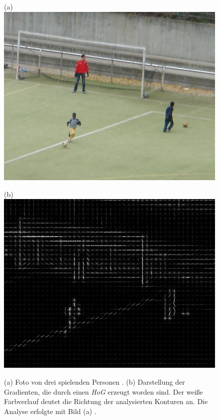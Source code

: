 
\begin{figure}[H]
	\centering
	\begin{minipage}[b]{0.47\textwidth}
		(a)
		\includegraphics[width=\textwidth]{Bilder/hog1crop.png}
	\end{minipage}
	\hfill
	\begin{minipage}[b]{0.47\textwidth}
		(b)
		\includegraphics[width=\textwidth]{Bilder/hog2crop.jpg}
	\end{minipage}
	\caption{(a) Foto von drei spielenden Personen \cite{inria1}. (b) Darstellung der Gradienten, die durch einen \textit{HoG} erzeugt worden sind. Der weiße Farbverlauf deutet die Richtung der analysierten Konturen an. Die Analyse erfolgte mit Bild (a) \cite{inria1}.}
	\label{fiq: hog}
\end{figure}
